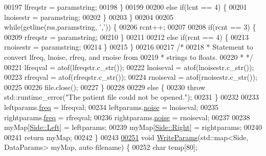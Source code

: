 \begin{DoxyCode}
00197                     lfreqstr = paramstring;
00198                 \}
00199 
00200                 \textcolor{keywordflow}{else} \textcolor{keywordflow}{if}(lcnt == 4) \{
00201                     lnoisestr = paramstring;
00202                 \}
00203             \}
00204 
00205             \textcolor{keywordflow}{while}(getline(rss,paramstring, \textcolor{charliteral}{','})) \{
00206                 rcnt++;
00207 
00208                 \textcolor{keywordflow}{if}(rcnt == 3) \{
00209                     rfreqstr = paramstring;
00210                 \}
00211 
00212                 \textcolor{keywordflow}{else} \textcolor{keywordflow}{if}(rcnt == 4) \{
00213                     rnoisestr = paramstring;
00214                 \}
00215             \}
00216 
00217             \textcolor{comment}{/*}
00218 \textcolor{comment}{             * Statement to convert lfreq, lnoise, rfreq, and rnoise from}
00219 \textcolor{comment}{             * strings to floats.}
00220 \textcolor{comment}{             * */}
00221             lfreqval = atof(lfreqstr.c\_str());
00222             lnoiseval = atof(lnoisestr.c\_str());
00223             rfreqval = atof(rfreqstr.c\_str());
00224             rnoiseval = atof(rnoisestr.c\_str());
00225 
00226             file.close();
00227         \}
00228 
00229         \textcolor{keywordflow}{else} \{
00230             \textcolor{keywordflow}{throw} std::runtime\_error(\textcolor{stringliteral}{"The patient file could not be opened."});
00231         \}
00232 
00233         leftparams.\hyperlink{structDataParams_a12566e017407647bc8287d62554ad3fb}{freq} = lfreqval;
00234         leftparams.\hyperlink{structDataParams_a4efd1d2231c6fa7c878c9d5e1650738f}{noise} = lnoiseval;
00235         rightparams.\hyperlink{structDataParams_a12566e017407647bc8287d62554ad3fb}{freq} = rfreqval;
00236         rightparams.\hyperlink{structDataParams_a4efd1d2231c6fa7c878c9d5e1650738f}{noise} = rnoiseval;
00237 
00238         myMap[\hyperlink{namespaceavda_af723e82f0d3d45fda6fdc01f6a492786a945d5e233cf7d6240f6b783b36a374ff}{Side::Left}] = leftparams;
00239         myMap[\hyperlink{namespaceavda_af723e82f0d3d45fda6fdc01f6a492786a92b09c7c48c520c3c55e497875da437c}{Side::Right}] = rightparams;
00240 
00241         \textcolor{keywordflow}{return} myMap;
00242     \}
00243 
\hypertarget{fileio_8hpp_source_l00251}{}\hyperlink{namespaceavda_aba04a08b41833ced32ec803d55a63bee}{00251}     \textcolor{keywordtype}{void} \hyperlink{namespaceavda_aba04a08b41833ced32ec803d55a63bee}{WriteParams}(std::map<Side, DataParams> myMap, \textcolor{keyword}{auto} filename) \{
00252         \textcolor{keywordtype}{char} temp[80];

\end{DoxyCode}
